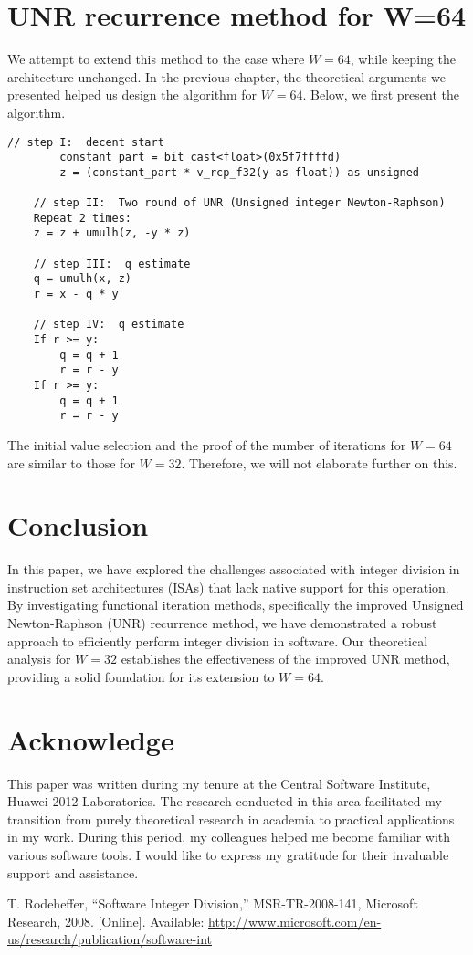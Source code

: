 \documentclass[12pt]{elsarticle}
\begin{document}
\section{UNR recurrence method for W=64}
We attempt to extend this method to the case where \(W = 64\), while keeping the architecture unchanged. In the previous chapter, the theoretical arguments we presented helped us design the algorithm for \(W = 64\). Below, we first present the algorithm. \\


\begin{Verbatim}[frame=single, fontsize=\small, label={Algorithm 3: UNR recurrence method for W=64.}]
    // step I:  decent start
        constant_part = bit_cast<float>(0x5f7ffffd)
        z = (constant_part * v_rcp_f32(y as float)) as unsigned
    
    // step II:  Two round of UNR (Unsigned integer Newton-Raphson)
    Repeat 2 times:
    z = z + umulh(z, -y * z)
    
    // step III:  q estimate
    q = umulh(x, z)
    r = x - q * y
    
    // step IV:  q estimate
    If r >= y:
        q = q + 1
        r = r - y
    If r >= y:
        q = q + 1
        r = r - y
    \end{Verbatim}
    The initial value selection and the proof of the number of iterations for \( W = 64 \) are similar to those for \( W = 32 \). Therefore, we will not elaborate further on this.


\section{Conclusion}
In this paper, we have explored the challenges associated with integer division in instruction set architectures (ISAs) that lack native support for this operation. By investigating functional iteration methods, specifically the improved Unsigned Newton-Raphson (UNR) recurrence method, we have demonstrated a robust approach to efficiently perform integer division in software. Our theoretical analysis for \( W = 32 \) establishes the effectiveness of the improved UNR method, providing a solid foundation for its extension to \( W = 64 \).

\section{Acknowledge}
This paper was written during my tenure at the Central Software Institute, Huawei 2012 Laboratories. The research conducted in this area facilitated my transition from purely theoretical research in academia to practical applications in my work. During this period, my colleagues helped me become familiar with various software tools. I would like to express my gratitude for their invaluable support and assistance.



\begin{thebibliography}{00}
    T. Rodeheffer, ``Software Integer Division,'' MSR-TR-2008-141, Microsoft Research, 2008. [Online]. Available: \url{http://www.microsoft.com/en-us/research/publication/software-int}
\end{thebibliography}
\end{document}

